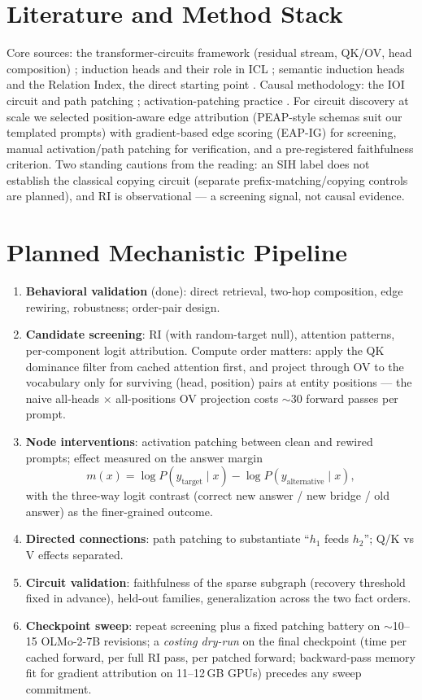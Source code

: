 \documentclass[11pt,a4paper]{article}
\begin{document}
\section{Literature and Method Stack}
Core sources: the transformer-circuits framework (residual stream, QK/OV, head composition) \cite{framework}; induction heads and their role in ICL \cite{olsson}; semantic induction heads and the Relation Index, the direct starting point \cite{ren}. Causal methodology: the IOI circuit and path patching \cite{ioi}; activation-patching practice \cite{patchguide}. For circuit discovery at scale we selected position-aware edge attribution (PEAP-style schemas suit our templated prompts) with gradient-based edge scoring (EAP-IG) for screening, manual activation/path patching for verification, and a pre-registered faithfulness criterion. Two standing cautions from the reading: an SIH label does not establish the classical copying circuit (separate prefix-matching/copying controls are planned), and RI is observational --- a screening signal, not causal evidence.

\section{Planned Mechanistic Pipeline}
\begin{enumerate}
\item \textbf{Behavioral validation} (done): direct retrieval, two-hop composition, edge rewiring, robustness; order-pair design.
\item \textbf{Candidate screening}: RI (with random-target null), attention patterns, per-component logit attribution. Compute order matters: apply the QK dominance filter from cached attention first, and project through OV to the vocabulary only for surviving (head, position) pairs at entity positions --- the naive all-heads $\times$ all-positions OV projection costs $\sim$30 forward passes per prompt.
\item \textbf{Node interventions}: activation patching between clean and rewired prompts; effect measured on the answer margin
\[
m(x)=\log P(y_{\mathrm{target}}\mid x)-\log P(y_{\mathrm{alternative}}\mid x),
\]
with the three-way logit contrast (correct new answer / new bridge / old answer) as the finer-grained outcome.
\item \textbf{Directed connections}: path patching to substantiate ``$h_1$ feeds $h_2$''; Q/K vs V effects separated.
\item \textbf{Circuit validation}: faithfulness of the sparse subgraph (recovery threshold fixed in advance), held-out families, generalization across the two fact orders.
\item \textbf{Checkpoint sweep}: repeat screening plus a fixed patching battery on $\sim$10--15 OLMo-2-7B revisions; a \emph{costing dry-run} on the final checkpoint (time per cached forward, per full RI pass, per patched forward; backward-pass memory fit for gradient attribution on 11--12\,GB GPUs) precedes any sweep commitment.
\end{enumerate}
\end{document}
